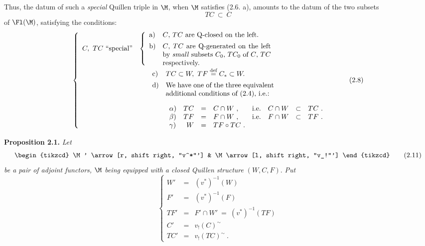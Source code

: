 Thus, the datum of such a \textit{special} Quillen triple in $\M$, when $\M$ satisfies (2.6. a), amounts to the datum of the two subsets
\[
TC \ \subset\ C
\tag*{(2.7)}
\]
of $\Fl(\M)$, satisfying the conditions:
\[
\left\{
\begin{array}{ll}
C,\ TC\ \text{``special''} &
\left\{\begin{array}{ll}
\text{a)} & \text{$C$, $TC$ are Q-closed on the left.}\\[1ex]
\text{b)} & \parbox[t]{0.45\textwidth}{$C$, $TC$ are Q-generated on the left by \textit{small} subsets $C_0$, $TC_0$ of $C$, $TC$ respectively.}
\end{array}\right.\\[5ex]
 & \quad\ \begin{array}{ll}
\text{c)} & TC \subset W,\ TF \overset{\text{def}}{=} C_* \subset W.\\[1ex]
\text{d)} & \parbox[t]{0.45\textwidth}{We have one of the three equivalent additional conditions of (2.4), i.e.:}\\[5ex]
 & \begin{array}{lrcllrcl}
\alpha) & TC & = & C \cap W\ , & \text{i.e.} & C \cap W & \subset & TC\ .\\
\beta) & TF & = & F \cap W\ , & \text{i.e.} & F \cap W & \subset & TF\ .\\
\gamma) & W & = & TF \circ TC\ . & & & &
\end{array}
\end{array}
\end{array}\right.
\tag*{(2.8)}
\]


\textbf{Proposition 2.1.} \textit{Let}
\[
\begin{tikzcd}
\M' \arrow[r, shift right, "v^*"'] & \M \arrow[l, shift right, "v_!"']
\end{tikzcd}
\tag*{(2.11)} %
\]
\textit{be a pair of adjoint functors, $\M$ being equipped with a closed Quillen structure} $(W,C,F)$. \textit{Put}
\[
\left\{
\begin{array}{rcl}
W' & = & (v^*)^{-1}(W)\\
F' & = & (v^*)^{-1}(F)\\
TF' & = & F' \cap W' \ = \ (v^*)^{-1}(TF)\\
C' & = & v_!(C)^{\sim}\\
TC' & = & v_!(TC)^{\sim}\ .
\end{array}\right.
\tag*{(2.1.2)}
\]

